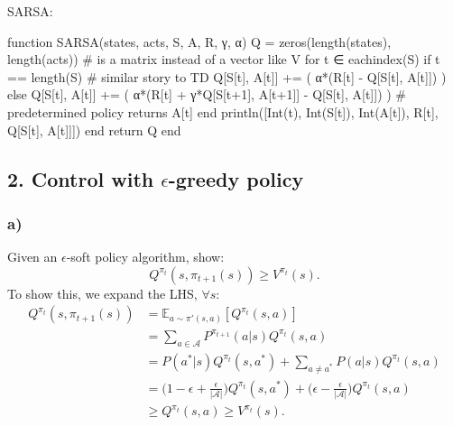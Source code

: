 \documentclass[12pt]{article}
\begin{document}
SARSA:
\begin{jllisting}
    function SARSA(states, acts, S, A, R, γ, α)
        Q = zeros(length(states), length(acts)) # is a matrix instead of a vector like V
        for t ∈ eachindex(S)
            if t == length(S) # similar story to TD
                Q[S[t], A[t]] += ( α*(R[t] - Q[S[t], A[t]]) )
            else
                Q[S[t], A[t]] += ( α*(R[t] + γ*Q[S[t+1], A[t+1]] - Q[S[t], A[t]]) ) # predetermined policy returns A[t]
            end
            println([Int(t), Int(S[t]), Int(A[t]), R[t], Q[S[t], A[t]]])
        end
        return Q
    end
\end{jllisting}

\subsection*{2. Control with $\epsilon$-greedy policy}
\subsubsection*{a)}
Given an $\epsilon$-soft policy algorithm, show:
\begin{equation}
	Q^{\pi_t}(s,\pi_{t+1}(s)) \geq V^{\pi_t}(s).
\end{equation}
To show this, we expand the LHS, $\forall s$:
\begin{equation}
	\begin{split}
		Q^{\pi_t}(s,\pi_{t+1}(s)) &= \mathbb{E}_{a\sim\pi'(s,a)}[Q^{\pi_{t}}(s,a)] \\
		&= \sum_{a \in \mathcal{A}} P^{\pi_{t+1}}(a|s)Q^{\pi_{t}}(s,a) \\
		&= P(a^*|s)Q^{\pi_{t}}(s,a^*) + \sum_{a \neq a^*}P(a|s)Q^{\pi_{t}}(s,a) \\
		&=\Big(1-\epsilon+\frac{\epsilon}{|\mathcal{A}|}\Big)Q^{\pi_{t}}(s,a^*) + \Big(\epsilon - \frac{\epsilon}{|\mathcal{A}|}\Big)Q^{\pi_{t}}(s,a) \\
		&\geq Q^{\pi_{t}}(s,a) \geq V^{\pi_t}(s).
	\end{split}
\end{equation}
\end{document}
